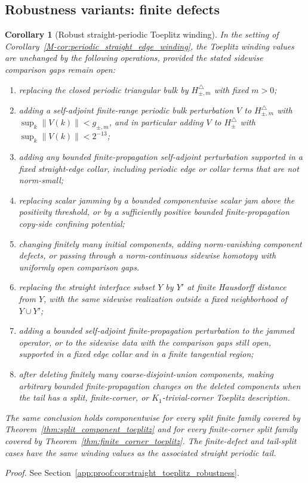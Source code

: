 \documentclass[11pt]{article}
\numberwithin{equation}{section}
\newtheorem{corollary}[theorem]{Corollary}
\theoremstyle{definition}
\theoremstyle{remark}
\newcommand{\proofref}[1]{%
  \par\noindent\emph{Proof.} See Section~\ref{#1}.\par\medskip
}
\newcommand{\proofappendixref}[1]{\proofref{#1}}
\newcommand{\opnorm}[1]{\left\lVert#1\right\rVert}
\begin{document}
\subsection{Robustness variants: finite defects}\label{app:robustness_finite_defects}
\begin{corollary}[Robust straight-periodic Toeplitz winding]\label{cor:straight_toeplitz_robustness}\label{cor:finite_defect_tail_toeplitz}
In the setting of Corollary~\ref{M-cor:periodic_straight_edge_winding}, the Toeplitz winding values
are unchanged by the following operations, provided the stated sidewise comparison gaps remain
open:
\begin{enumerate}[label=(\alph*),leftmargin=2em]
\item replacing the closed periodic triangular bulk by \(H_{\pm,m}^\triangle\) with fixed \(m>0\);
\item adding a self-adjoint finite-range periodic bulk perturbation \(V\) to \(H_{\pm,m}^\triangle\)
with \(\sup_k\opnorm{V(k)}<g_{\pm,m}\), and in particular adding \(V\) to \(H_\pm^\triangle\) with
\(\sup_k\opnorm{V(k)}<2^{-13}\);
\item adding any bounded finite-propagation self-adjoint perturbation supported in a fixed
straight-edge collar, including periodic edge or collar terms that are not norm-small;
\item replacing scalar jamming by a bounded componentwise scalar jam above the positivity
threshold, or by a sufficiently positive bounded finite-propagation copy-side confining potential;
\item changing finitely many initial components, adding norm-vanishing component defects, or passing
  through a norm-continuous sidewise homotopy with uniformly open comparison gaps.
\item replacing the straight interface subset \(Y\) by \(Y'\) at finite Hausdorff distance from \(Y\),
  with the same sidewise realization outside a fixed neighborhood of \(Y\cup Y'\);
\item adding a bounded self-adjoint finite-propagation perturbation to the jammed operator, or to the
  sidewise data with the comparison gaps still open, supported in a fixed edge collar and in a
  finite tangential region;
\item after deleting finitely many coarse-disjoint-union components, making arbitrary bounded
  finite-propagation changes on the deleted components when the tail has a split, finite-corner, or
  \(K_1\)-trivial-corner Toeplitz description.
\end{enumerate}
The same conclusion holds componentwise for every split finite family covered by
Theorem~\ref{thm:split_component_toeplitz} and for every finite-corner split family covered by
Theorem~\ref{thm:finite_corner_toeplitz}. The finite-defect and tail-split cases have the same
winding values as the associated straight periodic tail.
\end{corollary}
\proofappendixref{app:proof:cor:straight_toeplitz_robustness}
\end{document}
